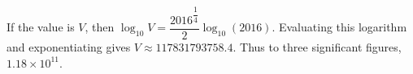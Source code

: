 If the value is $ V $, then $\log_{10}V=\dfrac{2016^{\dfrac{1}{4}}}{2}\log_{10}(2016)$. Evaluating this logarithm and exponentiating gives $ V\approx117831793758.4 $. Thus to three significant figures, $\boxed{1.18\times10^{11}}$.
